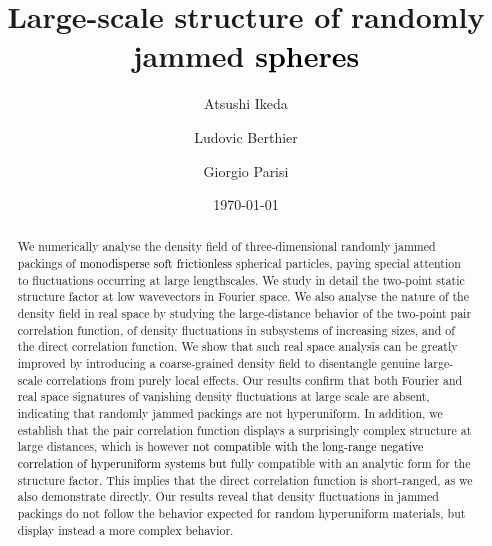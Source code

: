 \documentclass[aps,pre,twocolumn,superscriptaddress]{revtex4-1}
\newcommand{\red}[1]{\textcolor{black}{#1}}
\begin{document}
\title{Large-scale structure of randomly jammed \red{spheres}}

\author{Atsushi Ikeda}

\author{Ludovic Berthier}

\author{Giorgio Parisi}

\date{\today}

\begin{abstract}
We numerically analyse the density field of three-dimensional randomly jammed packings of 
\red{monodisperse soft frictionless} spherical particles, paying special attention to
fluctuations occurring at large lengthscales.
We study in detail the two-point static structure factor
at low wavevectors in Fourier space. We also analyse the nature of the density
field in real space by studying the large-distance behavior
of the two-point pair correlation function, of density 
fluctuations in subsystems of increasing sizes, and of the 
direct correlation function. We show that such real space analysis 
can be greatly improved by introducing
a coarse-grained density field to disentangle genuine large-scale 
correlations from purely local effects.
Our results confirm that both Fourier and real space signatures 
of vanishing density fluctuations at large scale are absent, indicating
that randomly jammed packings are not hyperuniform. 
In addition, we establish that the pair correlation function displays 
a surprisingly complex structure at large distances, 
which is however 
\red{not compatible with the long-range negative correlation of 
hyperuniform systems but} fully compatible 
with an analytic form for the structure factor. This implies
that the direct correlation function is short-ranged,
as we also demonstrate directly. 
Our results reveal that density fluctuations 
in jammed packings do not follow the behavior expected 
for random hyperuniform materials, but display instead a more
complex behavior.
\end{abstract}


\maketitle
\end{document}
